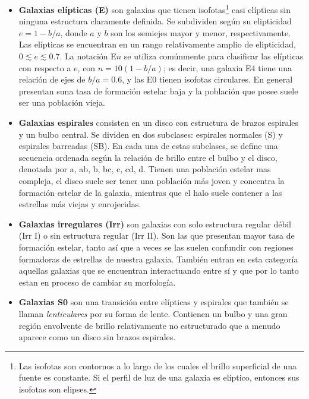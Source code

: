 \documentclass{article}
\begin{document}
\begin{itemize}
    \item \textbf{Galaxias elípticas (E)} son galaxias que tienen isofotas\footnote{Las isofotas son contornos a lo largo de los cuales el brillo superficial de una fuente es constante. Si el perfil de luz de una galaxia es elíptico, entonces sus isofotas son elipses.} casi elípticas sin ninguna estructura claramente definida. Se subdividen según su elipticidad $e = 1 - b/a$, donde $a$ y $b$ son los semiejes mayor y menor, respectivamente. Las elípticas se encuentran en un rango relativamente amplio de elipticidad, $0 \lesssim e\lesssim 0.7$. La notación E$n$ se utiliza comúnmente para clasificar las elípticas con respecto a $e$, con $n = 10(1 - b/a)$; es decir, una galaxia E4 tiene una relación de ejes de $b/a = 0.6$, y las E0 tienen isofotas circulares. En general presentan suna tasa de formación estelar baja y la población que posee suele ser una población vieja.

    \item \textbf{Galaxias espirales} consisten en un disco con estructura de brazos espirales y un bulbo central. Se dividen en dos subclases: espirales normales (S) y espirales barreadas (SB). En cada una de estas subclases, se define una secuencia ordenada según la relación de brillo entre el bulbo y el disco, denotada por a, ab, b, bc, c, cd, d. Tienen una población estelar mas compleja, el disco suele ser tener una población más joven y concentra la formación estelar de la galaxia, mientras que el halo suele contener a las estrellas más viejas y enrojecidas.

    \item \textbf{Galaxias irregulares (Irr)} son galaxias con solo estructura regular débil (Irr I) o sin estructura regular (Irr II). Son las que presentan mayor tasa de formación estelar, tanto así que a veces se las suelen confundir con regiones formadoras de estrellas de nuestra galaxia. También entran en esta categoría aquellas galaxias que se encuentran interactuando entre sí y que por lo tanto estan en proceso de cambiar su morfología.

    \item \textbf{Galaxias S0} son una transición entre elípticas y espirales que también se llaman \textit{lenticulares} por su forma de lente. Contienen un bulbo y una gran región envolvente de brillo relativamente no estructurado que a menudo aparece como un disco sin brazos espirales.
\end{itemize}
\end{document}
